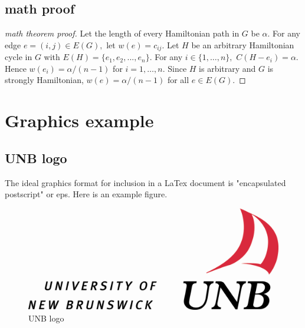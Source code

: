 \subsection{math proof}
\begin{proof}[math theorem proof]
Let the length of every Hamiltonian path in $G$ be $\alpha .$ For
any edge $e=(i,j)\in E(G),$ let $w(e)=c_{ij}.$ Let $H$ be an
arbitrary Hamiltonian cycle in $G$ with
$E(H)=\{e_{1},e_{2},...,e_{n}\}$. For any $i\in \{1,\ldots ,n\},$
$C(H-e_{i})=\alpha .$ Hence $w(e_{i})=\alpha/(n-1)$ for $i=1,\ldots
,n.$  Since $H$ is arbitrary and $G$ is strongly Hamiltonian,
$w(e)=\alpha /(n-1)$ for all $e\in E(G).$
\end{proof}

\section{Graphics example}
\subsection{UNB logo}
The ideal graphics format for inclusion in a LaTex document is
"encapsulated postscript" or eps. Here is an example figure.
\begin{figure}[!hbp]
\begin{center}
\includegraphics{unblogo}
\caption{UNB logo}
\end{center}
\end{figure}

